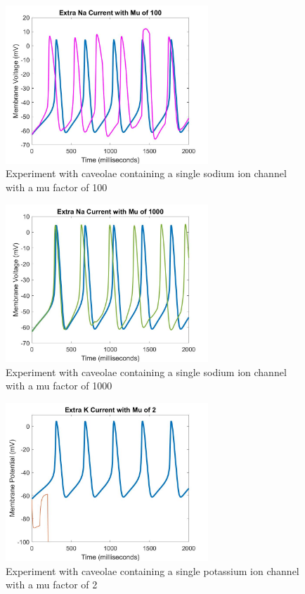 \documentclass{bmcart}%
\begin{document}
\begin{figure}[ht]
  \centering
  \includegraphics[width=3in]{images/NaMu100}
  \caption[SodiumMu100]
  {Experiment with caveolae containing a single sodium ion channel\\
  with a mu factor of 100}
\label{fig:NaMu100}
\end{figure}

\begin{figure}[ht]
  \centering
  \includegraphics[width=3in]{images/NaMu1000}
  \caption[SodiumMu1000]
  {Experiment with caveolae containing a single sodium ion channel\\
  with a mu factor of 1000}
\label{fig:NaMu1000}
\end{figure}


\begin{figure}[ht]
  \centering
  \includegraphics[width=3in]{images/KMu2}
  \caption[KMu2]
  {Experiment with caveolae containing a single potassium ion channel\\
  with a mu factor of 2}
\label{fig:KMu2}
\end{figure}
\end{document}
